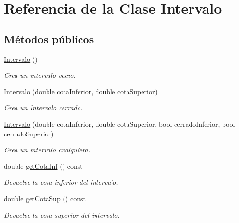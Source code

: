 \hypertarget{classIntervalo}{}\section{Referencia de la Clase Intervalo}
\label{classIntervalo}
\subsection*{Métodos públicos}
\begin{DoxyCompactItemize}
\item 
\hyperlink{classIntervalo_a9b5b23dda7ee26b444898457959cb03d}{Intervalo} ()\hypertarget{classIntervalo_a9b5b23dda7ee26b444898457959cb03d}{}\label{classIntervalo_a9b5b23dda7ee26b444898457959cb03d}

\begin{DoxyCompactList}\small\item\em Crea un intervalo vacio. \end{DoxyCompactList}\item 
\hyperlink{classIntervalo_a321e56ef7e1f4a774bd64cc2609156f4}{Intervalo} (double cota\+Inferior, double cota\+Superior)
\begin{DoxyCompactList}\small\item\em Crea un \hyperlink{classIntervalo}{Intervalo} cerrado. \end{DoxyCompactList}\item 
\hyperlink{classIntervalo_af70d523399465f51862977a303656c72}{Intervalo} (double cota\+Inferior, double cota\+Superior, bool cerrado\+Inferior, bool cerrado\+Superior)
\begin{DoxyCompactList}\small\item\em Crea un intervalo cualquiera. \end{DoxyCompactList}\item 
double \hyperlink{classIntervalo_af8170b68c6d6a63192db6685b90f782f}{get\+Cota\+Inf} () const 
\begin{DoxyCompactList}\small\item\em Devuelve la cota inferior del intervalo. \end{DoxyCompactList}\item 
double \hyperlink{classIntervalo_a7f8ff94ce16f90a81a3c55f36044893b}{get\+Cota\+Sup} () const 
\begin{DoxyCompactList}\small\item\em Devuelve la cota superior del intervalo. \end{DoxyCompactList}\item 

\end{DoxyCompactItemize}
